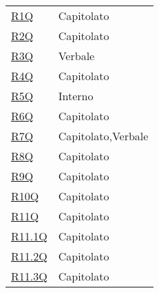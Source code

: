 \begin{center}
\begin{longtable}[!h]{p{50px} p{50px}}

        \hyperref[tab:RequisitiQualita]{R1Q}       & Capitolato                                     \\
        \hyperref[tab:RequisitiQualita]{R2Q}       & Capitolato                                     \\
        \hyperref[tab:RequisitiQualita]{R3Q}       & Verbale                                        \\
        \hyperref[tab:RequisitiQualita]{R4Q}       & Capitolato                                     \\
        \hyperref[tab:RequisitiQualita]{R5Q}       & Interno                                        \\
        \hyperref[tab:RequisitiQualita]{R6Q}       & Capitolato                                     \\
        \hyperref[tab:RequisitiQualita]{R7Q}       & Capitolato,\newline Verbale                    \\
        \hyperref[tab:RequisitiQualita]{R8Q}       & Capitolato                                     \\
        \hyperref[tab:RequisitiQualita]{R9Q}       & Capitolato                                     \\
        \hyperref[tab:RequisitiVincolo]{R10Q}      & Capitolato                                     \\
        \hyperref[tab:RequisitiVincolo]{R11Q}      & Capitolato                                     \\
        \hyperref[tab:RequisitiVincolo]{R11.1Q}    & Capitolato                                     \\
        \hyperref[tab:RequisitiVincolo]{R11.2Q}    & Capitolato                                     \\
        \hyperref[tab:RequisitiVincolo]{R11.3Q}    & Capitolato                                     \\



\end{longtable}
\end{center}
